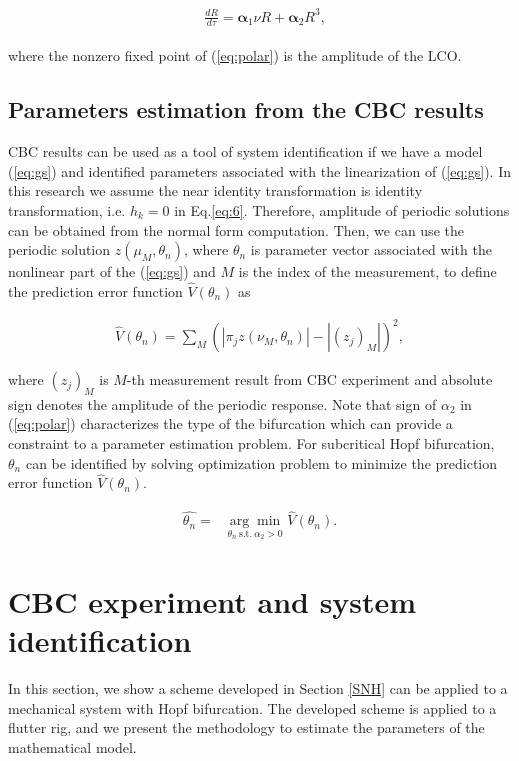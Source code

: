 \documentclass[openacc]{rsproca_new}%
\theoremstyle{own}
\def\vec#1{\ensuremath{\mathbf{#1}}}
\newcommand{\Eref}[1]{(\ref{#1})}
\begin{document}
\begin{align}\label{eq:polar}
  \begin{split}
    &\frac{dR}{d\tau}=\vec{\alpha}_1 \nu R+\vec{\alpha}_2 R^3,
  \end{split}
\end{align}

\noindent where the nonzero fixed point of \Eref{eq:polar} is the amplitude of the LCO.


\subsection{Parameters estimation from the CBC results}\label{NSI}
CBC results can be used as a tool of system identification if we have a model \Eref{eq:gs} and identified parameters associated with the linearization of \Eref{eq:gs}. In this research we assume the near identity transformation is identity transformation, i.e. $h_k=0$ in Eq.\ref{eq:6}. Therefore, amplitude of periodic solutions can be obtained from the normal form computation. Then, we can use the periodic solution $z(\mu_M,\theta_n)$, where $\theta_n$ is parameter vector associated with the nonlinear part of the \Eref{eq:gs} and $M$ is the index of the measurement, to define the prediction error function $\hat{V}(\theta_n)$ as

\begin{align}\label{NSI-2}
\hat{V}(\theta_n)= \sum_M (|\pi_j z(\nu_M,\theta_n)|-|(z_j)_M|)^2,
\end{align}

\noindent where $(z_j)_M$ is $M$-th measurement result from CBC experiment and absolute sign denotes the amplitude of the periodic response. Note that sign of $\alpha_2$ in \Eref{eq:polar} characterizes the type of the bifurcation which can provide a constraint to a parameter estimation problem. For subcritical Hopf bifurcation, $\theta_n$ can be identified by solving optimization problem to minimize the prediction error function $\hat{V}(\theta_n)$.

\begin{align}\label{NSI-3}
\hat{\theta_n}=&\underset{\theta_n \: \textrm{s.t.} \: \alpha_2>0} {\arg\min} \: \hat V(\theta_n).
\end{align}

\section{CBC experiment and system identification}
In this section, we show a scheme developed in Section \ref{SNH} can be applied to a mechanical system with Hopf bifurcation. The developed scheme is applied to a flutter rig, and we present the methodology to estimate the parameters of the mathematical model.
\end{document}
